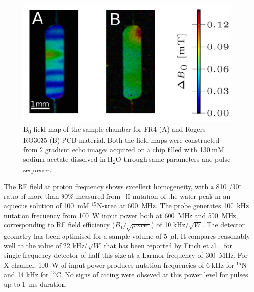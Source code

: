 \documentclass[preprint,5p]{elsarticle}
\begin{document}
\begin{figure} \centering
\includegraphics[width=.8\linewidth,keepaspectratio=true]{./figures/pcb-fieldmap-colorbar.png}
\caption{B\textsubscript{0} field map of the sample chamber for FR4 (A) and
Rogers RO3035 (B) PCB material. Both the field maps were constructed from 2
gradient echo images acquired on a chip filled with 130 mM sodium acetate
dissolved in H\textsubscript{2}O through same parameters and pulse sequence.}
\label{fig:field map}
\end{figure}

The RF field at proton frequency shows excellent homogeneity, with a
810$^{\circ}$/90$^{\circ}$ ratio of more than 90\% measured from $^1$H nutation
of the water peak in an aqueous solution of 100~mM $^{15}$N-urea at 600~MHz. The
probe generates 100~kHz nutation frequency from 100~W input power both at
600~MHz and 500~MHz, corresponding to RF field efficiency ($B_{1}/\sqrt{power}$)
of 10 kHz/$\sqrt{W}$. The detector geometry has been optimised for a sample
volume of 5~$\mu$l. It compares reasonably well to the value of 22
kHz/$\sqrt{W}$ that has been reported by Finch et al.~\cite{gream_2016} for
single-frequency detector of half this size at a Larmor frequency of 300~MHz.
For X channel, 100~W of input power produces nutation frequencies of 6 kHz for
$^{15}$N and 14 kHz for $^{13}$C. No signs of arcing were obseved at this power
level for pulses up to 1~ms duration.

\end{document}

